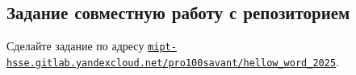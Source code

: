 \documentclass{article}
\begin{document}

\subsection{Задание совместную работу с репозиторием}
Сделайте задание по адресу  \texttt{\href{https://mipt-hsse.gitlab.yandexcloud.net/pro100savant/hellow_word_2025}{mipt-hsse.gitlab.yandexcloud.net/pro100savant/hellow\_word\_2025}}.
\end{document}
